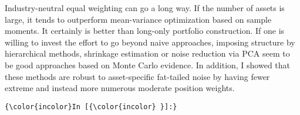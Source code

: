 \documentclass[11pt]{article}
\begin{document}
Industry-neutral equal weighting can go a long way. If the number of
assets is large, it tends to outperform mean-variance optimization based
on sample moments. It certainly is better than long-only portfolio
construction. If one is willing to invest the effort to go beyond naive
approaches, imposing structure by hierarchical methods, shrinkage
estimation or noise reduction via PCA seem to be good approaches based
on Monte Carlo evidence. In addition, I showed that these methods are
robust to asset-specific fat-tailed noise by having fewer extreme and
instead more numerous moderate position weights.

   \begin{Verbatim}[commandchars=\\\{\},fontsize=\scriptsize]
{\color{incolor}In [{\color{incolor} }]:} 
\end{Verbatim}


    
    
    
    
\end{document}
